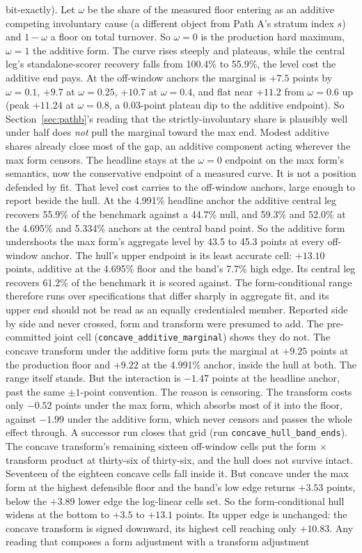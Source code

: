 \documentclass[12pt]{article}
\begin{document}
bit-exactly). Let $\omega$ be the share of the measured floor entering as an additive competing involuntary cause (a different object from Path A's stratum index $s$) and $1-\omega$ a floor on total turnover. So $\omega = 0$ is the production hard maximum, $\omega = 1$ the additive form. The curve rises steeply and plateaus, while the central leg's standalone-scorer recovery falls from 100.4\% to 55.9\%, the level cost the additive end pays. At the off-window anchors the marginal is $+7.5$ points by $\omega = 0.1$, $+9.7$ at $\omega = 0.25$, $+10.7$ at $\omega = 0.4$, and flat near $+11.2$ from $\omega = 0.6$ up (peak $+11.24$ at $\omega = 0.8$, a 0.03-point plateau dip to the additive endpoint). So Section~\ref{sec:pathb}'s reading that the strictly-involuntary share is plausibly well under half does \emph{not} pull the marginal toward the max end. Modest additive shares already close most of the gap, an additive component acting wherever the max form censors. The headline stays at the $\omega = 0$ endpoint on the max form's semantics, now the conservative endpoint of a measured curve. It is not a position defended by fit. That level cost carries to the off-window anchors, large enough to report beside the hull. At the 4.991\% headline anchor the additive central leg recovers 55.9\% of the benchmark against a 44.7\% null, and 59.3\% and 52.0\% at the 4.695\% and 5.334\% anchors at the central band point. So the additive form undershoots the max form's aggregate level by 43.5 to 45.3 points at every off-window anchor. The hull's upper endpoint is its least accurate cell: $+13.10$ points, additive at the 4.695\% floor and the band's 7.7\% high edge. Its central leg recovers 61.2\% of the benchmark it is scored against. The form-conditional range therefore runs over specifications that differ sharply in aggregate fit, and its upper end should not be read as an equally credentialed member. Reported side by side and never crossed, form and transform were presumed to add. The pre-committed joint cell (\texttt{concave\_additive\_marginal}) shows they do not. The concave transform under the additive form puts the marginal at $+9.25$ points at the production floor and $+9.22$ at the 4.991\% anchor, inside the hull at both. The range itself stands. But the interaction is $-1.47$ points at the headline anchor, past the same $\pm 1$-point convention. The reason is censoring. The transform costs only $-0.52$ points under the max form, which absorbs most of it into the floor, against $-1.99$ under the additive form, which never censors and passes the whole effect through. A successor run closes that grid (run \texttt{concave\_hull\_band\_ends}). The concave transform's remaining sixteen off-window cells put the form $\times$ transform product at thirty-six of thirty-six, and the hull does not survive intact. Seventeen of the eighteen concave cells fall inside it. But concave under the max form at the highest defensible floor and the band's low edge returns $+3.53$ points, below the $+3.89$ lower edge the log-linear cells set. So the form-conditional hull widens at the bottom to $+3.5$ to $+13.1$ points. Its upper edge is unchanged: the concave transform is signed downward, its highest cell reaching only $+10.83$. Any reading that composes a form adjustment with a transform adjustment 
\end{document}
